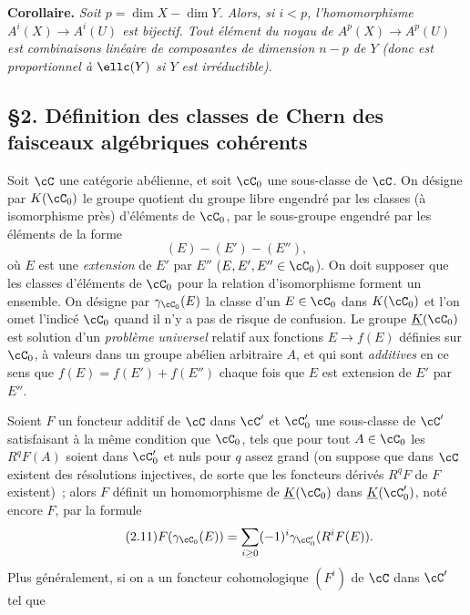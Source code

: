 \textbf{Corollaire.} \emph{Soit $p=\dim X-\dim Y$. Alors, si $i<p$, l'homomorphisme $A^i(X)\longrightarrow A^i(U)$ est bijectif. Tout élément du noyau de $A^p(X)\longrightarrow A^p(U)$ est combinaisons linéaire de composantes de dimension $n-p$ de $Y$ (donc est proportionnel à $\ellc(Y)$ si $Y$ est irréductible)}.

\subsection*{\S 2. Définition des classes de Chern des faisceaux algébriques cohérents}

Soit $\cC$ une catégorie abélienne, et soit $\cC_0$ une sous-classe de $\cC$. On désigne par $K(\cC_0)$ le groupe quotient du groupe libre engendré par les classes (à isomorphisme près) d'éléments de $\cC_0$, par le sous-groupe engendré par les éléments de la forme
\[
(E)-(E')-(E''),
\]
où $E$ est une \emph{extension} de $E'$ par $E''$ ($E,E',E''\in\cC_0$). On doit supposer que les classes d'éléments de $\cC_0$ pour la relation d'isomorphisme forment un ensemble. On désigne par $\gamma_{\cC_0}(E)$ la classe d'un $E\in\cC_0$ dans $K(\cC_0)$ et l'on omet l'indicé $\cC_0$ quand il n'y a pas de risque de confusion. Le groupe $\underline{K}(\cC_0)$ est solution d'un \emph{problème universel} relatif aux fonctions $E\longrightarrow f(E)$ définies sur $\cC_0$, à valeurs dans un groupe abélien arbitraire $A$, et qui sont \emph{additives} en ce sens que $f(E)=f(E')+f(E'')$ chaque fois que $E$ est extension de $E'$ par $E''$.

Soient $F$ un foncteur additif de $\cC$ dans $\cC'$ et $\cC'_0$ une sous-classe de $\cC'$ satisfaisant à la même condition que $\cC_0$, tels que pour tout $A\in\cC_0$ les $R^qF(A)$ soient dans $\cC'_0$ et nuls pour $q$ assez grand (on suppose que dans $\cC$ existent des résolutions injectives, de sorte que les foncteurs dérivés $R^qF$ de $F$ existent)~; alors $F$ définit un homomorphisme de $\underline{K}(\cC_0)$ dans $\underline{K}(\cC'_0)$, noté encore $F$, par la formule
\begin{equation}\tag{2.11}
 F(\gamma_{\cC_0}(E))=\sum_{i\geq 0}(-1)^i\gamma_{\cC'_0}(R^iF(E)).
\end{equation}
Plus généralement, si on a un foncteur cohomologique $(F^i)$ de $\cC$ dans $\cC'$ tel que
